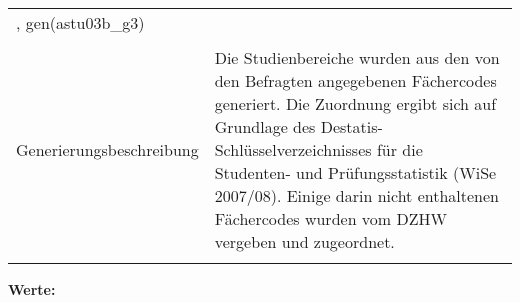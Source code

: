 \begin{tabular}{lL{11.3cm}}
, gen(astu03b\_g3) \\
				 \\
					Generierungsbeschreibung & Die Studienbereiche wurden aus den von den Befragten angegebenen Fächercodes generiert. Die Zuordnung ergibt sich auf Grundlage des Destatis-Schlüsselverzeichnisses für die Studenten- und Prüfungsstatistik (WiSe 2007/08).  Einige darin nicht enthaltenen Fächercodes wurden vom DZHW vergeben und zugeordnet. 
				 \\	
			 \\
		\end{tabular}






			\vspace*{1 cm}
			\noindent\textbf{Werte:}\\
